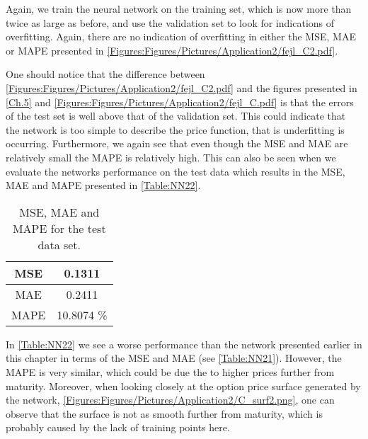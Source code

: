 Again, we train the neural network on the training set, which is now more than twice as large as before, and use the validation set to look for indications of overfitting. Again, there are no indication of overfitting in either the MSE, MAE or MAPE presented in \autoref{Figures:Figures/Pictures/Application2/fejl_C2.pdf}.


One should notice that the difference between \autoref{Figures:Figures/Pictures/Application2/fejl_C2.pdf} and the figures presented in \autoref{Ch.5} and \autoref{Figures:Figures/Pictures/Application2/fejl_C.pdf} is that the errors of the test set is well above that of the validation set. This could indicate that the network is too simple to describe the price function, that is underfitting is occurring. Furthermore, we again see that even though the MSE and MAE are relatively small the MAPE is relatively high. This can also be seen when we evaluate the networks performance on the test data which results in the MSE, MAE and MAPE presented in \autoref{Table:NN22}.

\begin{table}[H]
    \centering
    {\renewcommand{\arraystretch}{1.25}\begin{tabular}{c|c}
        MSE  &  0.1311\\ \hline
        MAE  &  0.2411\\ \hline
        MAPE &  10.8074  \%\\ 
    \end{tabular}}
    \caption{MSE, MAE and MAPE for the test data set.}
    \label{Table:NN22}
\end{table}

In \autoref{Table:NN22} we see a worse performance than the network presented earlier in this chapter in terms of the MSE and MAE (see \autoref{Table:NN21}). However, the MAPE is very similar, which could be due the to higher prices further from maturity. Moreover, when looking closely at the option price surface generated by the network, \autoref{Figures:Figures/Pictures/Application2/C_surf2.png}, one can observe that the surface is not as smooth further from maturity, which is probably caused by the lack of training points here. 


